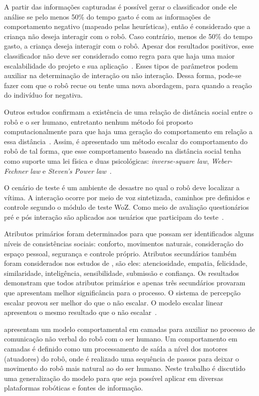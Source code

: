 A partir das informações capturadas é possível gerar o classificador onde ele análise se pelo menos 50\% do tempo gasto é com as informações de comportamento negativo (mapeado pelas heurísticas), então é considerado que a criança não deseja interagir com o robô. Caso contrário, menos de 50\% do tempo gasto, a criança deseja interagir com o robô. Apesar dos resultados positivos, esse classificador não deve ser considerado como regra para que haja uma maior escalabilidade do projeto e sua aplicação~\cite{Feil-Seifer:2010}. Esses tipos de parâmetros podem auxiliar na determinação de interação ou não interação. Dessa forma, pode-se fazer com que o robô recue ou tente uma nova abordagem, para quando a reação do indivíduo for negativa.

Outros estudos confirmam a existência de uma relação de distância social entre o robô e o ser humano, entretanto nenhum método foi proposto computacionalmente para que haja uma geração do comportamento em relação a essa distância~\cite{Henkel:2012b}. Assim, é apresentado um método escalar do comportamento do robô de tal forma, que esse comportamento baseado na distância social tenha como suporte uma lei física e duas psicológicas: \emph{inverse-square law}, \emph{Weber-Fechner law} e \emph{Steven's Power law}~\cite{Henkel:2012b}.

O cenário de teste é um ambiente de desastre no qual o robô deve localizar a vítima. A interação ocorre por meio de voz sintetizada, caminhos pre definidos e controle segundo o módulo de teste WoZ. Como meio de avaliação questionários pré e pós interação são aplicados aos usuários que participam do teste~\cite{Henkel:2012b}.

Atributos primários foram determinados para que possam ser identificados alguns níveis de consistências sociais: conforto, movimentos naturais, consideração do espaço pessoal, segurança e controle próprio. Atributos secundários também foram considerados nos estudos de , são eles: atenciosidade, empatia, felicidade, similaridade, inteligência, sensibilidade, submissão e confiança. Os resultados demonstram que todos atributos primários e apenas três secundários provaram que apresentam melhor significância para o processo. O sistema de percepção escalar provou ser melhor do que o não escalar. O modelo escalar linear apresentou o mesmo resultado que o não escalar~\cite{Henkel:2012b}.

 apresentam um modelo comportamental em camadas para auxiliar no processo de comunicação não verbal do robô com o ser humano. Um comportamento em camadas é definido como um processamento de saída a nível dos motores (atuadores) do robô, onde é realizado uma sequência de passos para deixar o movimento do robô mais natural ao do ser humano. Neste trabalho é discutido uma generalização do modelo para que seja possível aplicar em diversas plataformas robóticas e fontes de informação.

